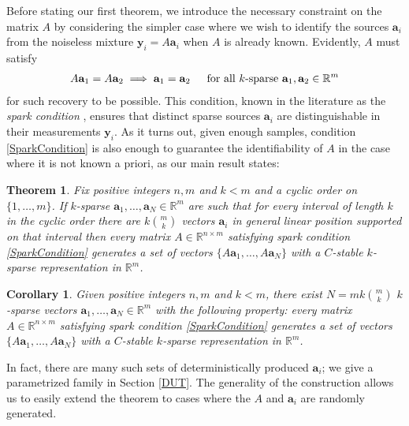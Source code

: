 \documentclass[journal, onecolumn]{IEEEtran}
\newtheorem{theorem}{Theorem}
\newtheorem{corollary}{Corollary}
\begin{document}
Before stating our first theorem, we introduce the necessary constraint on the matrix $A$ by considering the simpler case where we wish to identify the sources $\mathbf{a}_i$ from the noiseless mixture $\mathbf{y}_i = A\mathbf{a}_i$ when $A$ is already known. Evidently, $A$ must satisfy
\begin{align}\label{SparkCondition}
A\mathbf{a}_1 = A\mathbf{a}_2 \implies \mathbf{a}_1 = \mathbf{a}_2 \indent \text{for all $k$-sparse } \mathbf{a}_1, \mathbf{a}_2 \in \mathbb{R}^m
\end{align}
%
for such recovery to be possible. This condition, known in the literature as the \emph{spark condition} \cite{ref?}, ensures that distinct sparse sources $\mathbf{a}_i$ are distinguishable in their measurements $\mathbf{y}_i$. As it turns out, given enough samples, condition \eqref{SparkCondition} is also enough to guarantee the identifiability of $A$ in the case where it is not known a priori, as our main result states:


\begin{theorem}\label{DeterministicUniquenessTheorem}
Fix positive integers $n, m$ and $k < m$ and a cyclic order on $\{1, \ldots, m\}$. If $k$-sparse $\mathbf{a}_1, \ldots, \mathbf{a}_N \in \mathbb{R}^m$ are such that for every interval of length $k$ in the cyclic order there are $k{m \choose k}$ vectors $\mathbf{a}_i$ in general linear position supported on that interval then every matrix $A \in \mathbb{R}^{n \times m}$ satisfying spark condition \eqref{SparkCondition} generates a set of vectors $\{A\mathbf{a}_1, \ldots, A\mathbf{a}_N\}$ with a $C$-stable $k$-sparse representation in $\mathbb{R}^m$.
\end{theorem}

\begin{corollary}\label{DeterministicUniquenessCorollary}
Given positive integers $n, m$ and $k < m$, there exist $N =  mk{m \choose k}$ $k$-sparse vectors $\mathbf{a}_1, \ldots, \mathbf{a}_N \in \mathbb{R}^m$ with the following property: every matrix $A \in \mathbb{R}^{n \times m}$ satisfying spark condition \eqref{SparkCondition} generates a set of vectors $\{A\mathbf{a}_1, \ldots, A\mathbf{a}_N\}$ with a $C$-stable $k$-sparse representation in $\mathbb{R}^m$.
\end{corollary}

In fact, there are many such sets of deterministically produced $\mathbf{a}_i$; we give a parametrized family in Section \ref{DUT}. The generality of the construction allows us to easily extend the theorem to cases where the $A$ and $\mathbf{a}_i$ are randomly generated.
\end{document}
